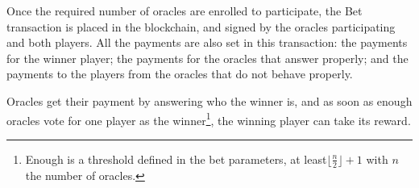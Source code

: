 Once the required number of oracles are enrolled to participate, the Bet
  transaction is placed in the blockchain, and signed by the oracles
  participating and both players.
All the payments are also set in this transaction: the payments for the winner
  player; the payments for the oracles that answer properly; and the payments
  to the players from the oracles that do not behave properly.

Oracles get their payment by answering who the winner is, and as soon as
  enough oracles vote for one player as the winner\footnote{Enough is a
  threshold defined in the bet parameters, at least$\lfloor \frac{n}{2}
  \rfloor + 1$ with $n$ the number of oracles.}, the winning  player can take
  its reward.
